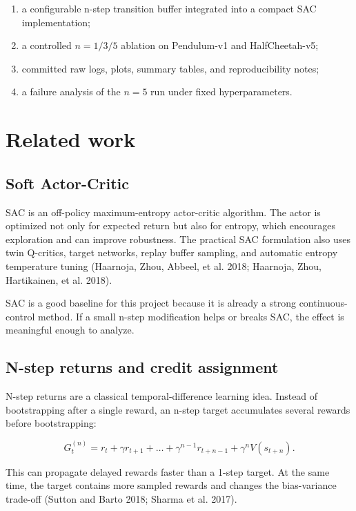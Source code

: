 \documentclass[
  american,
]{article}
\providecommand{\tightlist}{%
  \setlength{\itemsep}{0pt}\setlength{\parskip}{0pt}}
\begin{document}
\begin{enumerate}
\def\labelenumi{\arabic{enumi}.}
\tightlist
\item
  a configurable n-step transition buffer integrated into a compact SAC
  implementation;
\item
  a controlled \(n=1/3/5\) ablation on Pendulum-v1 and HalfCheetah-v5;
\item
  committed raw logs, plots, summary tables, and reproducibility notes;
\item
  a failure analysis of the \(n=5\) run under fixed hyperparameters.
\end{enumerate}

\section{Related work}\label{related-work}

\subsection{Soft Actor-Critic}\label{soft-actor-critic}

SAC is an off-policy maximum-entropy actor-critic algorithm. The actor
is optimized not only for expected return but also for entropy, which
encourages exploration and can improve robustness. The practical SAC
formulation also uses twin Q-critics, target networks, replay buffer
sampling, and automatic entropy temperature tuning (Haarnoja, Zhou,
Abbeel, et al. 2018; Haarnoja, Zhou, Hartikainen, et al. 2018).

SAC is a good baseline for this project because it is already a strong
continuous-control method. If a small n-step modification helps or
breaks SAC, the effect is meaningful enough to analyze.

\subsection{N-step returns and credit
assignment}\label{n-step-returns-and-credit-assignment}

N-step returns are a classical temporal-difference learning idea.
Instead of bootstrapping after a single reward, an n-step target
accumulates several rewards before bootstrapping:

\[
G_t^{(n)} = r_t + \gamma r_{t+1} + \dots + \gamma^{n-1} r_{t+n-1} + \gamma^n V(s_{t+n}).
\]

This can propagate delayed rewards faster than a 1-step target. At the
same time, the target contains more sampled rewards and changes the
bias-variance trade-off (Sutton and Barto 2018; Sharma et al. 2017).
\end{document}
